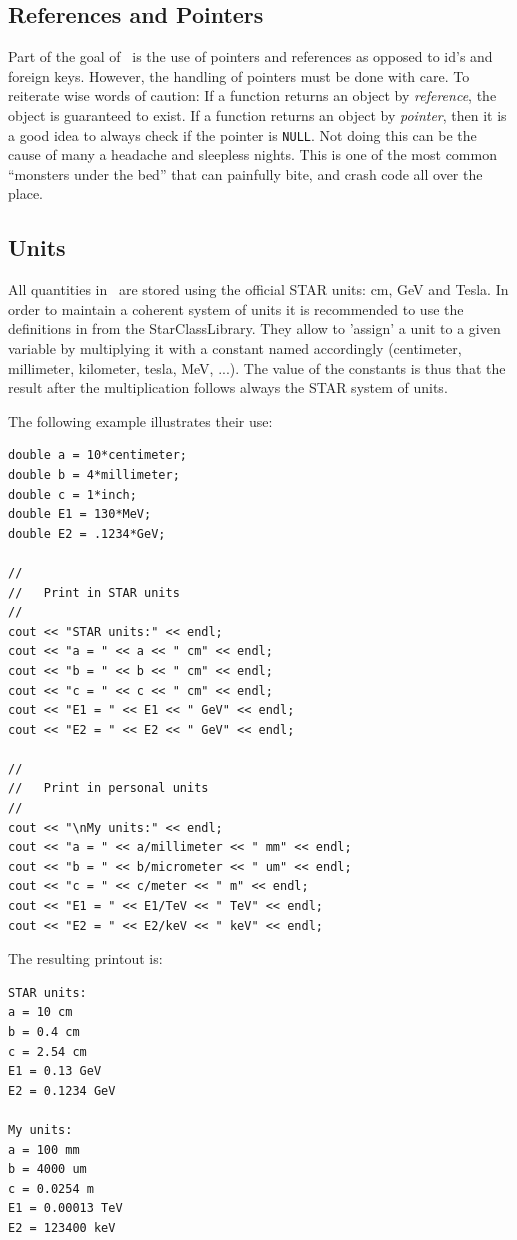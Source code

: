 \subsection {References and Pointers}
Part of the goal of \StMcEvent\ is the use of pointers and references
as opposed to id's and foreign keys.  However, the handling of
pointers must be done with care.
To reiterate wise words of caution: If a function returns an object by
\textit{reference},
the object is guaranteed to exist.  If a function returns an object by {\it pointer},
then it is a good idea to always check if the pointer is \verb+NULL+. Not doing
this can be the cause of many a headache and sleepless nights.  This is one of
the most common ``monsters under the bed'' that can painfully bite, 
and crash code all over the place.

\subsection{Units}
 
\label{sec:units}

All quantities in \StMcEvent\ are stored using the official STAR units:
cm, GeV and Tesla.  In order to maintain a coherent system of units it
is recommended to use the definitions in  from
the StarClassLibrary. They allow to 'assign' a unit to a given
variable by multiplying it with a constant named accordingly
(centimeter, millimeter, kilometer, tesla, MeV, ...).  The value of
the constants is thus that the result after the multiplication follows
always the STAR system of units.

The following example illustrates their use:
{\footnotesize
\begin{verbatim}
double a = 10*centimeter;
double b = 4*millimeter;
double c = 1*inch;
double E1 = 130*MeV;
double E2 = .1234*GeV;

//
//   Print in STAR units
//
cout << "STAR units:" << endl;
cout << "a = " << a << " cm" << endl;
cout << "b = " << b << " cm" << endl;
cout << "c = " << c << " cm" << endl;
cout << "E1 = " << E1 << " GeV" << endl;
cout << "E2 = " << E2 << " GeV" << endl;

//
//   Print in personal units
//
cout << "\nMy units:" << endl;
cout << "a = " << a/millimeter << " mm" << endl;
cout << "b = " << b/micrometer << " um" << endl;
cout << "c = " << c/meter << " m" << endl;
cout << "E1 = " << E1/TeV << " TeV" << endl;
cout << "E2 = " << E2/keV << " keV" << endl;
\end{verbatim}
}%
The resulting printout is:
{\footnotesize
\begin{verbatim}
STAR units:
a = 10 cm
b = 0.4 cm
c = 2.54 cm
E1 = 0.13 GeV
E2 = 0.1234 GeV

My units:
a = 100 mm
b = 4000 um
c = 0.0254 m
E1 = 0.00013 TeV
E2 = 123400 keV
\end{verbatim}
}%

